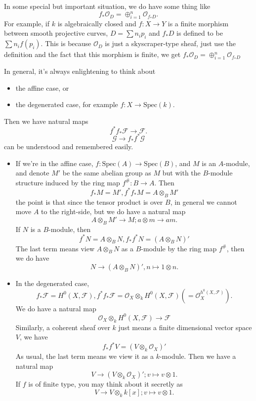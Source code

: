 \documentclass[../main.tex]{subfiles}
\begin{document}
\begin{remark}
In some special but important situation, we do have some thing like $$f_{*}\mathcal{O}_{D}=\oplus_{i=1}^{n}\mathcal{O}_{f_{*}D}.$$
For example, if $k$ is algebraically closed and $f:X\rightarrow Y$ is a finite morphism between smooth projective curves, $D=\sum n_{i}p_{i}$ and $f_{*}D$ is defined to be $\sum n_{i}f(p_{i})$. This is because $\mathcal{O}_{D}$ is just a skyscraper-type sheaf, just use the definition and the fact that this morphism is finite, we get $f_{*}\mathcal{O}_{D}=\oplus_{i=1}^{n}\mathcal{O}_{f_{*}D}$
\end{remark}



\begin{example}
In general, it's always enlightening to think about 
\begin{itemize}
\item the affine case, or
\item the degenerated case, for example $f: X\rightarrow \mathrm{Spec}(k).$
\end{itemize}
Then we have natural maps 
$$f^{*}f_{*}\mathscr{F}\rightarrow \mathscr{F}.$$
$$\mathscr{G}\rightarrow f_{*}f^{*}\mathscr{G}$$
can be understood and remembered easily. 
\begin{itemize}
\item If we're in the affine case, $f:\mathrm{Spec}(A)\rightarrow \mathrm{Spec}(B)$, and $M$ is an $A$-module, and denote $M'$ be the same abelian group as $M$ but with the $B$-module structure induced by the ring map $f^{\#}: B\rightarrow A$. Then $$f_{*}M=M', f^{*}f_{*}M=A\otimes_{B}M'$$
the point is that since the tensor product is over $B$, in general we cannot move $A$ to the right-side, but we do have a natural map
$$A\otimes_{B}M'\rightarrow M; a\otimes m\rightarrow am.$$
If $N$ is a $B$-module, then $$f^{*}N=A\otimes_{B}N, f_{*}f^{*}N=(A\otimes_{B}N)'$$
The last term means view $A\otimes_{B}N$ as a $B$-module by the ring map $f^{\#}$, then we do have 
$$N\rightarrow (A\otimes_{B}N)', n\mapsto 1\otimes n.$$
\item In the degenerated case, 
$$f_{*}\mathscr{F}=H^{0}(X,\mathscr{F}), f^{*}f_{*}\mathscr{F}=\mathcal{O}_{X}\otimes_{k}H^{0}(X,\mathscr{F})(=\mathcal{O}_{X}^{h^{0}(X,\mathscr{F})}).$$
We do have a natural map 
$$\mathcal{O}_{X}\otimes_{k}H^{0}(X,\mathscr{F})\rightarrow \mathscr{F}$$
Similarly, a coherent sheaf over $k$ just means a finite dimensional vector space $V$, we have 
$$f_{*}f^{*}V=(V\otimes_{k}\mathcal{O}_{X})'$$
As usual, the last term means we view it as a $k$-module. Then we have a natural map
$$V\rightarrow (V\otimes_{k}\mathcal{O}_{X})'; v\mapsto v\otimes 1.$$
If $f$ is of finite type, you may think about it secretly as 
$$V\rightarrow V\otimes_{k}k[x]; v\mapsto v\otimes 1.$$

\end{itemize}
\end{example}
\end{document}
